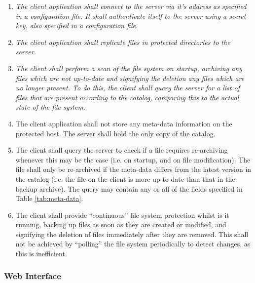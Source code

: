 \begin{enumerate}
    \item \emph{The client application shall connect to the server via it's
        address as specified in a configuration file. It shall authenticate
        itself to the server using a secret key, also specified in
        a configuration file.}
    \item \emph{The client application shall replicate files in protected
        directories to the server.}
    \item \emph{The client shall perform a scan of the file system on startup,
        archiving any files which are not up-to-date and signifying the
        deletion any files which are no longer present. To do this, the client
        shall query the server for a list of files that are present according
        to the catalog, comparing this to the actual state of the file system.}
    \item The client application shall not store any meta-data information on
        the protected host. The server shall hold the only copy of the catalog.
    \item The client shall query the server to check if a file requires
        re-archiving whenever this may be the case (i.e. on startup, and on
        file modification). The file shall only be re-archived if the meta-data
        differs from the latest version in the catalog (i.e. the file on the
        client is more up-to-date than that in the backup archive). The query
        may contain any or all of the fields specified in Table
        \ref{tab:meta-data}.
    \item The client shall provide ``continuous'' file system protection whilst
        is it running, backing up files as soon as they are created or
        modified, and signifying the deletion of files immediately after they
        are removed. This shall not be achieved by ``polling'' the file system
        periodically to detect changes, as this is inefficient.
\end{enumerate}

\subsubsection{Web Interface}


